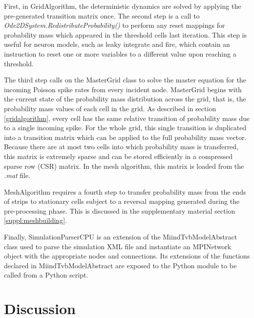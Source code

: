 \documentclass[utf8]{frontiersSCNS} %
\begin{document}
First, in GridAlgorithm, the deterministic dynamics are solved by applying the pre-generated transition matrix once. The second step is a call to \textit{Ode2DSystem.RedistributeProbability()} to perform any reset mappings for probability mass which appeared in the threshold cells last iteration. This step is useful for neuron models, such as leaky integrate and fire, which contain an instruction to reset one or more variables to a different value upon reaching a threshold.

The third step calls on the MasterGrid class to solve the master equation for the incoming Poisson spike rates from every incident node. MasterGrid begins with the current state of the probability mass distribution across the grid, that is, the probability mass values of each cell in the grid. As described in section \ref{gridalgorithm}, every cell has the same relative transition of probability mass due to a single incoming spike. For the whole grid, this single transition is duplicated into a transition matrix which can be applied to the full probability mass vector. Because there are at most two cells into which probability mass is transferred, this matrix is extremely sparse and can be stored efficiently in a compressed sparse row (CSR) matrix. In the mesh algorithm, this matrix is loaded from the \textit{.mat} file.

MeshAlgorithm requires a fourth step to transfer probability mass from the ends of strips to stationary cells subject to a reversal mapping generated during the pre-processing phase. This is discussed in the supplementary material section \ref{suppl:meshbuilding}.

Finally, SimulationParserCPU is an extension of the MiindTvbModelAbstract class used to parse the simulation XML file and instantiate an MPINetwork object with the appropriate nodes and connections. Its extensions of the functions declared in MiindTvbModelAbstract are exposed to the Python module to be called from a Python script. 

\section{Discussion}
\end{document}
